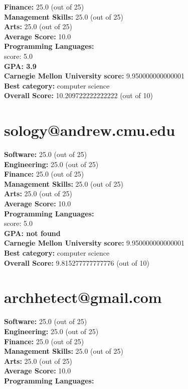 \documentclass{article}
\begin{document}
    \textbf{Finance:} 25.0 (out of 25)\\
    \textbf{Management Skills:} 25.0 (out of 25)\\
    \textbf{Arts:} 25.0 (out of 25)\\
\textbf{Average Score: } 10.0\\
\textbf{Programming Languages:} \\
score: 5.0\\
\textbf{GPA: 3.9}\\
\textbf{Carnegie Mellon University} \textbf{score:} 9.950000000000001\\
\textbf{Best category: } computer science\\
    \textbf{Overall Score: }10.209722222222222 (out of 10)\section{sology@andrew.cmu.edu}
\textbf{Software:} 25.0 (out of 25)\\
    \textbf{Engineering: } 25.0 (out of 25)\\
    \textbf{Finance:} 25.0 (out of 25)\\
    \textbf{Management Skills:} 25.0 (out of 25)\\
    \textbf{Arts:} 25.0 (out of 25)\\
\textbf{Average Score: } 10.0\\
\textbf{Programming Languages:} \\
score: 5.0\\
\textbf{GPA: not found}\\
\textbf{Carnegie Mellon University} \textbf{score:} 9.950000000000001\\
\textbf{Best category: } computer science\\
    \textbf{Overall Score: }9.815277777777776 (out of 10)\section{archhetect@gmail.com}
\textbf{Software:} 25.0 (out of 25)\\
    \textbf{Engineering: } 25.0 (out of 25)\\
    \textbf{Finance:} 25.0 (out of 25)\\
    \textbf{Management Skills:} 25.0 (out of 25)\\
    \textbf{Arts:} 25.0 (out of 25)\\
\textbf{Average Score: } 10.0\\
\textbf{Programming Languages:} \\
\end{document}
